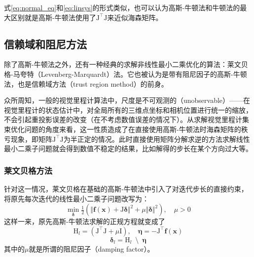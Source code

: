 式\eqref{eq:normal_eq}和\eqref{eq:linsys}的形式类似，也可以认为高斯-牛顿法和牛顿法的最大区别就是高斯-牛顿法使用了$\mathrm{J}^\top\mathrm{J}$来近似海森矩阵。

\subsection{信赖域和阻尼方法}

除了高斯-牛顿法之外，还有一种经典的求解非线性最小二乘优化的算法：莱文贝格-马夸特（Levenberg-Marquardt）法。它也被认为是带有阻尼因子的高斯-牛顿法，也是信赖域方法（trust region method）的前身\citep{jorge2006numerical}。

众所周知，一般的视觉里程计算法中，尺度是不可观测的（unobservable）——在视觉里程计的状态估计中，对全局所有的三维点坐标和相机位置进行统一的缩放，不会引起重投影误差的改变（在不考虑数值误差的情况下）。从求解视觉里程计集束优化问题的角度来看，这一性质造成了在直接使用高斯-牛顿法时海森矩阵的秩亏现象，即矩阵$\mathrm{J}^\top\mathrm{J}$为半正定的情况。此时直接使用矩阵分解求逆的方法求解线性最小二乘子问题就会得到数值不稳定的结果，比如解得的步长在某个方向过大等。

\subsubsection*{莱文贝格方法}

针对这一情况，莱文贝格在基础的高斯-牛顿法中引入了对迭代步长的直接约束，将原先每次迭代的线性最小二乘子问题改写为：
\begin{equation}
    \mathop{\min}_{\bm{\delta}} \tfrac{1}{2}
    \left(
        \Vert \bm{f}(\bm{x}) + \mathrm{J}\bm{\delta} \Vert^2 +
        \mu \Vert \bm{\delta} \Vert^2
    \right), \quad \mu > 0
\end{equation}
这样一来，原先高斯-牛顿法求解的正规方程就变成了
\begin{equation}
    \mathrm{H}_{l} = \left( \mathrm{J}^\top\mathrm{J}+\mu\mathrm{I} \right), \quad
    \bm{\eta}      = -\mathrm{J}^\top\bm{f}(\bm{x})
\end{equation}
\begin{equation}
    \bm{\delta}_{l} = \mathrm{H}_{l} \enspace\setminus\enspace \bm{\eta}
    \label{eq:levenberg}
\end{equation}
其中的$\mu$就是所谓的阻尼因子（damping factor）。

